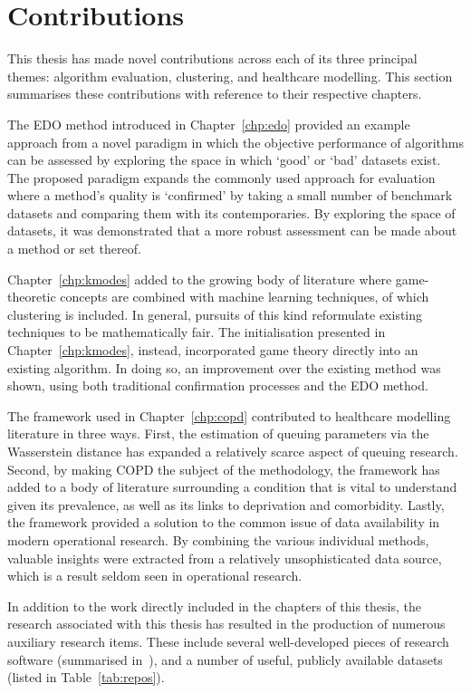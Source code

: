 \section{Contributions}\label{sec:contributions}

This thesis has made novel contributions across each of its three principal
themes: algorithm evaluation, clustering, and healthcare modelling. This section
summarises these contributions with reference to their respective chapters.

The EDO method introduced in Chapter~\ref{chp:edo} provided an example approach
from a novel paradigm in which the objective performance of algorithms can be
assessed by exploring the space in which `good' or `bad' datasets exist. The
proposed paradigm expands the commonly used approach for evaluation where a
method's quality is `confirmed' by taking a small number of benchmark datasets
and comparing them with its contemporaries. By exploring the space of datasets,
it was demonstrated that a more robust assessment can be made about a method or
set thereof.

Chapter~\ref{chp:kmodes} added to the growing body of literature where
game-theoretic concepts are combined with machine learning techniques, of which
clustering is included. In general, pursuits of this kind reformulate existing
techniques to be mathematically fair. The initialisation presented in
Chapter~\ref{chp:kmodes}, instead, incorporated game theory directly into an
existing algorithm. In doing so, an improvement over the existing method was
shown, using both traditional confirmation processes and the EDO method.

The framework used in Chapter~\ref{chp:copd} contributed to healthcare modelling
literature in three ways. First, the estimation of queuing parameters via the
Wasserstein distance has expanded a relatively scarce aspect of queuing
research. Second, by making COPD the subject of the methodology, the framework
has added to a body of literature surrounding a condition that is vital to
understand given its prevalence, as well as its links to deprivation and
comorbidity. Lastly, the framework provided a solution to the common issue of
data availability in modern operational research. By combining the various
individual methods, valuable insights were extracted from a relatively
unsophisticated data source, which is a result seldom seen in operational
research.

In addition to the work directly included in the chapters of this thesis, the
research associated with this thesis has resulted in the production of numerous
auxiliary research items. These include several well-developed pieces of
research software (summarised in~), and a number of
useful, publicly available datasets (listed in Table~\ref{tab:repos}).


